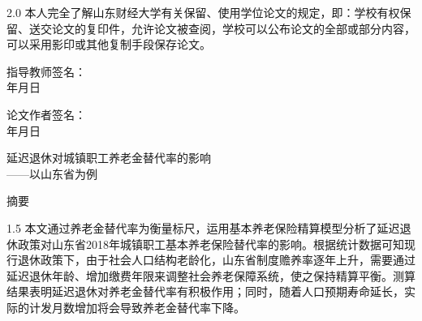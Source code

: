 \documentclass[a4paper,12pt]{ctexart}
\newcommand{\xiaoer}{\fontsize{18pt}{27pt}\selectfont}
\newcommand{\sanhao}{\fontsize{16pt}{24pt}\selectfont}
\newcommand{\sihao}{\fontsize{14pt}{21pt}\selectfont}
\newcommand{\xiaosi}{\fontsize{12pt}{20pt}\selectfont}
\newcommand{\fixedunderline}[2][8em]{\underline{\makebox[#1][c]{#2}}}
\numberwithin{equation}{section}
\begin{document}
\begin{spacing}{2.0}
{\sihao\setlength{\parindent}{2em}
本人完全了解山东财经大学有关保留、使用学位论文的规定，即：学校有权保留、送交论文的复印件，允许论文被查阅，学校可以公布论文的全部或部分内容，可以采用影印或其他复制手段保存论文。
}
\end{spacing}

\vspace{1.6cm}

\noindent
\begin{minipage}[t]{0.46\textwidth}
  {\sihao 指导教师签名：\fixedunderline[5.6em]{}}\\[0.55cm]
  {\sihao \hspace*{1.8em}\fixedunderline[2.2em]{}年\fixedunderline[1.8em]{}月\fixedunderline[1.8em]{}日}
\end{minipage}
\hfill
\begin{minipage}[t]{0.46\textwidth}
  {\sihao 论文作者签名：\fixedunderline[5.6em]{}}\\[0.55cm]
  {\sihao \hspace*{1.8em}\fixedunderline[2.2em]{}年\fixedunderline[1.8em]{}月\fixedunderline[1.8em]{}日}
\end{minipage}

\newpage

\pagestyle{mainmatter}
\setcounter{page}{1}

\vspace*{0.55cm}

\begin{center}
  {\heiti\xiaoer 延迟退休对城镇职工养老金替代率的影响}\\[0.15cm]
  {\heiti\xiaoer ——以山东省为例}
\end{center}

\vspace{0.55cm}

\begin{center}
  {\heiti\sanhao 摘\hspace{1em}要}
\end{center}

\vspace{0.45cm}

\begin{spacing}{1.5}
\xiaosi\songti
\setlength{\parindent}{2em}
本文通过养老金替代率为衡量标尺，运用基本养老保险精算模型分析了延迟退休政策对山东省2018年城镇职工基本养老保险替代率的影响。根据统计数据可知现行退休政策下，由于社会人口结构老龄化，山东省制度赡养率逐年上升，需要通过延迟退休年龄、增加缴费年限来调整社会养老保障系统，使之保持精算平衡。测算结果表明延迟退休对养老金替代率有积极作用；同时，随着人口预期寿命延长，实际的计发月数增加将会导致养老金替代率下降。
\end{spacing}
\end{document}
